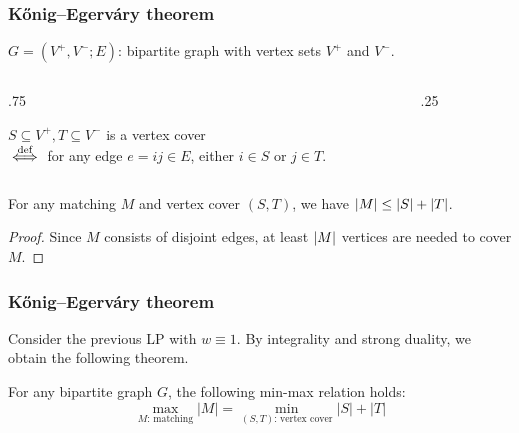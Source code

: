 \documentclass[14pt,aspectratio=169,xcolor=dvipsnames,table,onlytextwidth]{beamer}
\begin{document}
\begin{frame}
    \frametitle{K\H{o}nig--Egerv\'ary theorem}

    $G = (V^+, V^-; E)$: bipartite graph with vertex sets $V^+$ and $V^-$. 
    \begin{columns}
    \begin{column}{.75\textwidth}
    \begin{definition}
        $S \subseteq V^+, T \subseteq V^-$ is a \alert{vertex cover} \\
        $\overset{\text{def}}{\iff}$ for any edge $e = ij \in E$, either $i \in S$ or $j \in T$.
    \end{definition}
    \end{column}
    \begin{column}{.25\textwidth}
        \centering
        \footnotesize
    \end{column}
    \end{columns}

    \vfill
    \begin{lemma}
        For any matching $M$ and vertex cover $(S,T)$, we have $\lvert M\rvert \leq \lvert S\rvert + \lvert T\rvert$.
    \end{lemma}
    \begin{proof}
        Since $M$ consists of disjoint edges, at least $\lvert M\rvert$ vertices are needed to cover $M$.
    \end{proof}
\end{frame}

\begin{frame}
    \frametitle{K\H{o}nig--Egerv\'ary theorem}
    Consider the previous LP with $w \equiv 1$. By integrality and strong duality, we obtain the following theorem.

    \bigskip
    \begin{theorem}
        For any bipartite graph $G$, the following min-max relation holds:
        \[
            \max_{\text{$M$: matching}} |M| = \min_{\text{$(S,T)$: vertex cover}} |S| + |T|
        \]
    \end{theorem}
\end{frame}
\end{document}
